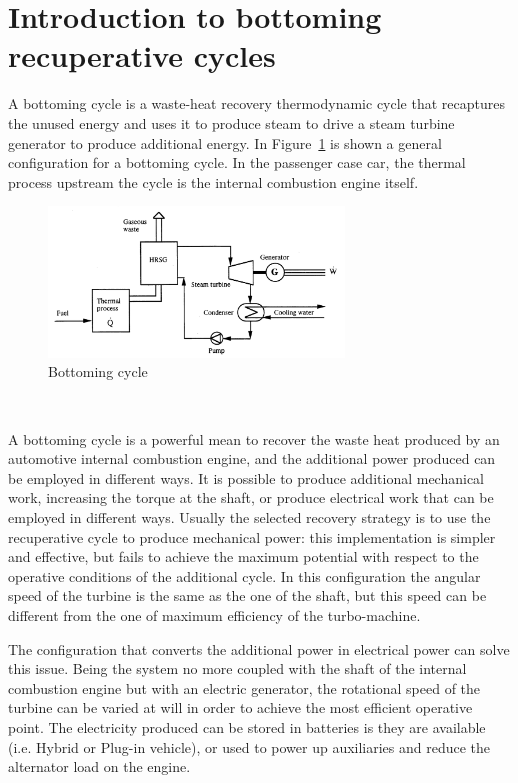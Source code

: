 \section{Introduction to bottoming recuperative cycles}

A bottoming cycle is a waste-heat recovery thermodynamic cycle that recaptures the unused energy and uses it to produce steam to drive a steam turbine generator to produce additional energy. In Figure~\ref{fig:bottoming} is shown a general configuration for a bottoming cycle. In the passenger case car, the thermal process upstream the cycle is the internal combustion engine itself.

\begin{figure}[ht]
  \centering
  \includegraphics[width=0.7\textwidth]{figures/review/bottoming.jpg}
  \caption{Bottoming cycle \label{fig:bottoming} }
\end{figure}
~

A bottoming cycle is a powerful mean to recover the waste heat produced by an automotive internal combustion engine, and the additional power produced can be employed in different ways. It is possible to produce additional mechanical work, increasing the torque at the shaft, or produce electrical work that can be employed in different ways. Usually the selected recovery strategy is to use the recuperative cycle to produce mechanical power: this implementation is simpler and effective, but fails to achieve the maximum potential with respect to the operative conditions of the additional cycle. In this configuration the angular speed of the turbine is the same as the one of the shaft, but this speed can be different from the one of maximum efficiency of the turbo-machine.

The configuration that converts the additional power in electrical power can solve this issue. Being the system no more coupled with the shaft of the internal combustion engine but with an electric generator, the rotational speed of the turbine can be varied at will in order to achieve the most efficient operative point. The electricity produced can be stored in batteries is they are available (i.e. Hybrid or Plug-in vehicle), or used to power up auxiliaries and reduce the alternator load on the engine.

